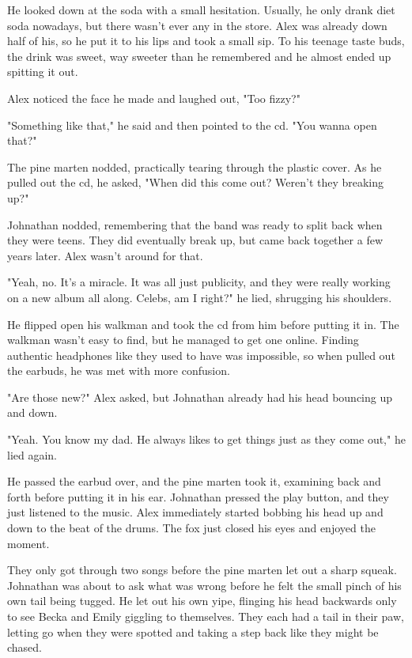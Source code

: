 He looked down at the soda with a small hesitation. Usually, he only drank diet soda nowadays, but there wasn't ever any in the store. Alex was already down half of his, so he put it to his lips and took a small sip. To his teenage taste buds, the drink was sweet, way sweeter than he remembered and he almost ended up spitting it out.

Alex noticed the face he made and laughed out, "Too fizzy?"

"Something like that," he said and then pointed to the cd. "You wanna open that?"

The pine marten nodded, practically tearing through the plastic cover. As he pulled out the cd, he asked, "When did this come out? Weren't they breaking up?"

Johnathan nodded, remembering that the band was ready to split back when they were teens. They did eventually break up, but came back together a few years later. Alex wasn't around for that.

"Yeah, no. It's a miracle. It was all just publicity, and they were really working on a new album all along. Celebs, am I right?" he lied, shrugging his shoulders.

He flipped open his walkman and took the cd from him before putting it in. The walkman wasn't easy to find, but he managed to get one online. Finding authentic headphones like they used to have was impossible, so when pulled out the earbuds, he was met with more confusion.

"Are those new?" Alex asked, but Johnathan already had his head bouncing up and down.

"Yeah. You know my dad. He always likes to get things just as they come out," he lied again.

He passed the earbud over, and the pine marten took it, examining back and forth before putting it in his ear. Johnathan pressed the play button, and they just listened to the music. Alex immediately started bobbing his head up and down to the beat of the drums. The fox just closed his eyes and enjoyed the moment.

They only got through two songs before the pine marten let out a sharp squeak. Johnathan was about to ask what was wrong before he felt the small pinch of his own tail being tugged. He let out his own yipe, flinging his head backwards only to see Becka and Emily giggling to themselves. They each had a tail in their paw, letting go when they were spotted and taking a step back like they might be chased.


